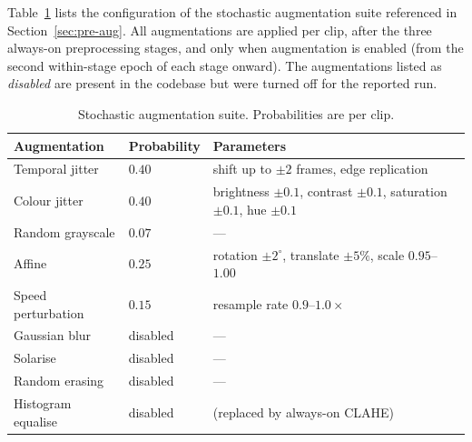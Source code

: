 \documentclass{article}
\begin{document}
Table~\ref{tab:aug} lists the configuration of the stochastic augmentation
suite referenced in Section~\ref{sec:pre-aug}. All augmentations are
applied per clip, after the three always-on preprocessing stages, and only
when augmentation is enabled (from the second within-stage epoch of each
stage onward). The augmentations listed as \emph{disabled} are present in
the codebase but were turned off for the reported run.

\begin{table}[H]
\centering
\caption{Stochastic augmentation suite. Probabilities are per clip.}
\label{tab:aug}
\begin{tabular}{l l l}
\toprule
Augmentation       & Probability & Parameters \\
\midrule
Temporal jitter    & $0.40$ & shift up to $\pm 2$ frames, edge replication \\
Colour jitter      & $0.40$ & brightness $\pm 0.1$, contrast $\pm 0.1$, saturation $\pm 0.1$, hue $\pm 0.1$ \\
Random grayscale   & $0.07$ & --- \\
Affine             & $0.25$ & rotation $\pm 2^\circ$, translate $\pm 5\%$, scale $0.95$--$1.00$ \\
Speed perturbation & $0.15$ & resample rate $0.9$--$1.0\times$ \\
\midrule
Gaussian blur      & disabled & --- \\
Solarise           & disabled & --- \\
Random erasing     & disabled & --- \\
Histogram equalise & disabled & (replaced by always-on CLAHE) \\
\bottomrule
\end{tabular}
\end{table}




\end{document}
